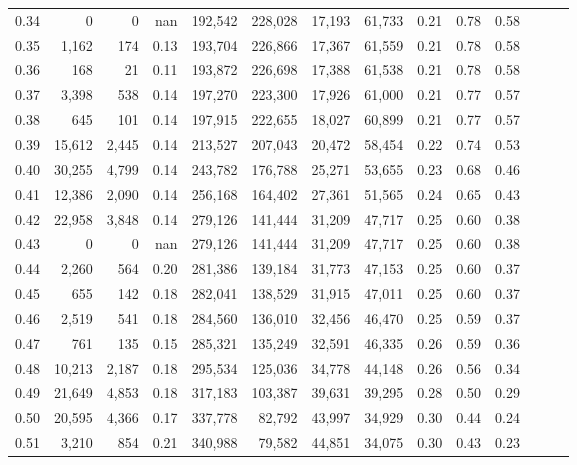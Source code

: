 \begin{tabular}{rrrrrrrrrrrrrr}
0.34 &       0 &      0 &   nan &  192,542 &  228,028 &  17,193 &  61,733 &  0.21 &  0.78 &      0.58 \\
0.35 &   1,162 &    174 &  0.13 &  193,704 &  226,866 &  17,367 &  61,559 &  0.21 &  0.78 &      0.58 \\
0.36 &     168 &     21 &  0.11 &  193,872 &  226,698 &  17,388 &  61,538 &  0.21 &  0.78 &      0.58 \\
0.37 &   3,398 &    538 &  0.14 &  197,270 &  223,300 &  17,926 &  61,000 &  0.21 &  0.77 &      0.57 \\
0.38 &     645 &    101 &  0.14 &  197,915 &  222,655 &  18,027 &  60,899 &  0.21 &  0.77 &      0.57 \\
0.39 &  15,612 &  2,445 &  0.14 &  213,527 &  207,043 &  20,472 &  58,454 &  0.22 &  0.74 &      0.53 \\
0.40 &  30,255 &  4,799 &  0.14 &  243,782 &  176,788 &  25,271 &  53,655 &  0.23 &  0.68 &      0.46 \\
0.41 &  12,386 &  2,090 &  0.14 &  256,168 &  164,402 &  27,361 &  51,565 &  0.24 &  0.65 &      0.43 \\
0.42 &  22,958 &  3,848 &  0.14 &  279,126 &  141,444 &  31,209 &  47,717 &  0.25 &  0.60 &      0.38 \\
0.43 &       0 &      0 &   nan &  279,126 &  141,444 &  31,209 &  47,717 &  0.25 &  0.60 &      0.38 \\
0.44 &   2,260 &    564 &  0.20 &  281,386 &  139,184 &  31,773 &  47,153 &  0.25 &  0.60 &      0.37 \\
0.45 &     655 &    142 &  0.18 &  282,041 &  138,529 &  31,915 &  47,011 &  0.25 &  0.60 &      0.37 \\
0.46 &   2,519 &    541 &  0.18 &  284,560 &  136,010 &  32,456 &  46,470 &  0.25 &  0.59 &      0.37 \\
0.47 &     761 &    135 &  0.15 &  285,321 &  135,249 &  32,591 &  46,335 &  0.26 &  0.59 &      0.36 \\
0.48 &  10,213 &  2,187 &  0.18 &  295,534 &  125,036 &  34,778 &  44,148 &  0.26 &  0.56 &      0.34 \\
0.49 &  21,649 &  4,853 &  0.18 &  317,183 &  103,387 &  39,631 &  39,295 &  0.28 &  0.50 &      0.29 \\
0.50 &  20,595 &  4,366 &  0.17 &  337,778 &   82,792 &  43,997 &  34,929 &  0.30 &  0.44 &      0.24 \\
0.51 &   3,210 &    854 &  0.21 &  340,988 &   79,582 &  44,851 &  34,075 &  0.30 &  0.43 &      0.23 \\

\end{tabular}
